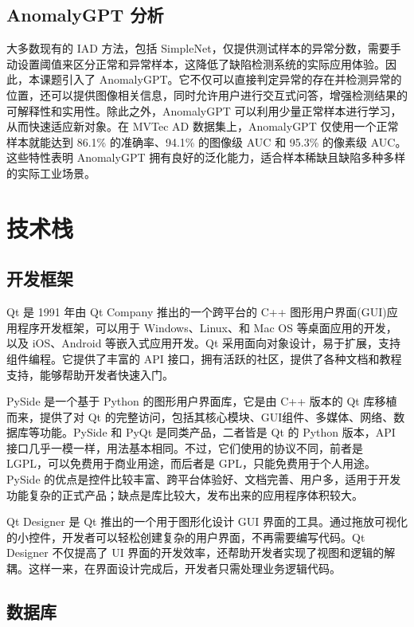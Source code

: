 \documentclass[
  ]{njuthesis}
\begin{document}
\subsection{AnomalyGPT 分析}

大多数现有的 IAD 方法，包括 SimpleNet，仅提供测试样本的异常分数，需要手动设置阈值来区分正常和异常样本，这降低了缺陷检测系统的实际应用体验。因此，本课题引入了 AnomalyGPT。它不仅可以直接判定异常的存在并检测异常的位置，还可以提供图像相关信息，同时允许用户进行交互式问答，增强检测结果的可解释性和实用性。除此之外，AnomalyGPT 可以利用少量正常样本进行学习，从而快速适应新对象。在 MVTec AD 数据集上，AnomalyGPT 仅使用一个正常样本就能达到 86.1\% 的准确率、94.1\% 的图像级 AUC 和 95.3\% 的像素级 AUC。这些特性表明 AnomalyGPT 拥有良好的泛化能力，适合样本稀缺且缺陷多种多样的实际工业场景。

\section{技术栈}

\subsection{开发框架}

Qt 是 1991 年由 Qt Company 推出的一个跨平台的 C++ 图形用户界面(GUI)应用程序开发框架，可以用于 Windows、Linux、和 Mac OS 等桌面应用的开发，以及 iOS、Android 等嵌入式应用开发。Qt 采用面向对象设计，易于扩展，支持组件编程。它提供了丰富的 API 接口，拥有活跃的社区，提供了各种文档和教程支持，能够帮助开发者快速入门。

PySide 是一个基于 Python 的图形用户界面库，它是由 C++ 版本的 Qt 库移植而来，提供了对 Qt 的完整访问，包括其核心模块、GUI组件、多媒体、网络、数据库等功能。PySide 和 PyQt 是同类产品，二者皆是 Qt 的 Python 版本，API 接口几乎一模一样，用法基本相同。不过，它们使用的协议不同，前者是 LGPL，可以免费用于商业用途，而后者是 GPL，只能免费用于个人用途。PySide 的优点是控件比较丰富、跨平台体验好、文档完善、用户多，适用于开发功能复杂的正式产品；缺点是库比较大，发布出来的应用程序体积较大。

Qt Designer 是 Qt 推出的一个用于图形化设计 GUI 界面的工具。通过拖放可视化的小控件，开发者可以轻松创建复杂的用户界面，不再需要编写代码。Qt Designer 不仅提高了 UI 界面的开发效率，还帮助开发者实现了视图和逻辑的解耦。这样一来，在界面设计完成后，开发者只需处理业务逻辑代码。

\subsection{数据库}
\end{document}
